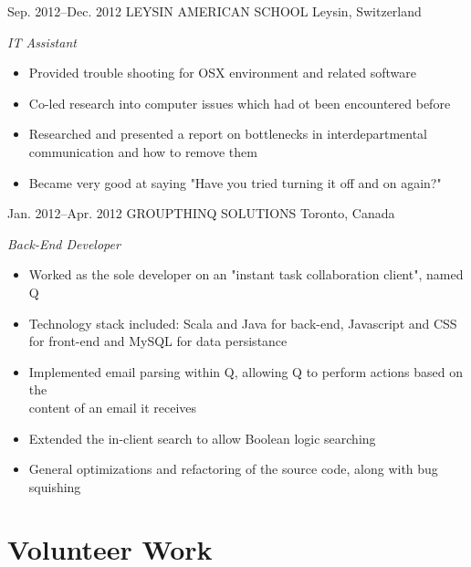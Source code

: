 \documentclass[]{friggeri-cv} %
\begin{document}
\begin{entrylist}
\entry
{Sep. 2012--Dec. 2012}
{LEYSIN AMERICAN SCHOOL}
{Leysin, Switzerland}
{\emph{IT Assistant} \\
\begin{itemize}
	\item Provided trouble shooting for OSX environment and related software
	\item Co-led research into computer issues which had ot been encountered before
	\item Researched and presented a report on bottlenecks in interdepartmental communication and how to remove them
	\item Became very good at saying "Have you tried turning it off and on again?" 
\end{itemize}
}
\end{entrylist}

\begin{entrylist}
\entry
{Jan. 2012--Apr. 2012}
{GROUPTHINQ SOLUTIONS}
{Toronto, Canada}
{\emph{Back-End Developer} \\
\begin{itemize}
	\item Worked as the sole developer on an "instant task collaboration client", named Q
	\item Technology stack included: Scala and Java for back-end, Javascript  and CSS for front-end and MySQL for data persistance
	\item Implemented email parsing within Q, allowing Q to perform actions based on the \\ content of an email it receives 	
	\item Extended the in-client search to allow Boolean logic searching
	\item General optimizations and refactoring of the source code, along with bug squishing
\end{itemize}
}
\end{entrylist}




\section{Volunteer Work}
\end{document}

